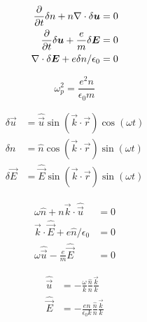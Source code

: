 \documentclass[aps,pre,notitlepage,amsmath,amssymb,amsfonts,nobibnotes,nofootinbib,superscriptaddress,onecolumn,a4paper,10pt]{revtex4-1}
\begin{document}
\begin{align}
  \frac{\partial}{\partial t}\delta n + n\nabla\cdot\delta\bm{u} &= 0 \\
  \frac{\partial}{\partial t}\delta\bm{u} + \frac{e}{m}\delta\bm{E} &= 0 \\
  \nabla\cdot\delta\bm{E} + e\delta n/\epsilon_0 &= 0
\end{align}

\begin{equation}
  \omega_p^2 = \frac{e^2 n}{\epsilon_0 m}
\end{equation}

\begin{align}
  \delta\vec{u} &= \hat{\vec{u}}\sin(\vec{k}\cdot\vec{r})\cos(\omega t) \\
  \delta n &= \hat{n}\cos(\vec{k}\cdot\vec{r})\sin(\omega t) \\
  \delta\vec{E} &= \hat{\vec{E}}\sin(\vec{k}\cdot\vec{r})\sin(\omega t)
\end{align}

\begin{align}
  \omega\hat{n} + n\vec{k}\cdot\hat{\vec{u}} &= 0 \\
  \vec{k}\cdot\hat{\vec{E}} + e\hat{n}/\epsilon_0 &= 0 \\
  \omega\hat{\vec{u}} - \frac{e}{m}\hat{\vec{E}} &= 0
\end{align}

\begin{align}
  \hat{\vec{u}} &= -\frac{\omega}{k}\frac{\hat{n}}{n}\frac{\vec{k}}{k} \\
  \hat{\vec{E}} &= -\frac{en}{\epsilon_0 k}\frac{\hat{n}}{n}\frac{\vec{k}}{k}
\end{align}
\end{document}
